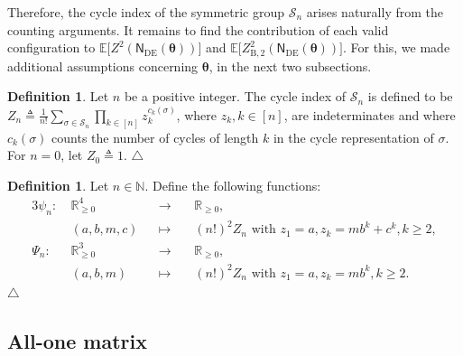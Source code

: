 \documentclass[conference]{IEEEtran}
\theoremstyle{plain}
\theoremstyle{definition}
\newtheorem{definition}[thm]{Definition}
\newcommand{\edefn}{\hfill$\triangle$}
\providecommand{\N}{\mathbb {N}}
\providecommand{\R}{\mathbb {R}}
\newcommand{\B}{\mathrm{B}}
\newcommand{\E}{\mathbb {E}}
\newcommand{\sfn}{\mathsf{N}}
\newcommand{\btheta}{\boldsymbol{\theta}}
\newcommand{\defeq}{\triangleq}
\newcommand{\sfnDE}{\sfn_{\mathrm{DE}}}
\begin{document}

Therefore, the cycle index of the symmetric group $\mathcal{S}_n$ arises
naturally from the counting arguments. It remains to find the contribution of
each valid configuration to $\E \big[Z^2(\sfnDE(\btheta))\big]$ and $ \E
\big[Z_{\B,2}^2(\sfnDE(\btheta))\big]$. For this, we made additional
assumptions concerning $\btheta$, in the next two subsections.


\begin{definition}
 Let $n$ be a positive integer. The cycle index of $\mathcal{S}_n$ is defined
 to be
 $Z_n \defeq \frac{1}{n!}\sum_{\sigma\in
   \mathcal{S}_n}\prod_{k\in[n]}z_k^{c_k(\sigma)}$, where $z_k,k\in [n]$, are
 indeterminates and where $c_k(\sigma)$ counts the number of cycles of length
 $k$ in the cycle representation of $\sigma$. For $n = 0$, let
 $Z_0 \defeq 1$.
 \edefn
\end{definition}


\begin{definition}
 Let $n\in\N$. Define the following functions:
 \begin{alignat*}{3}
  \psi_n : \
   & \R_{\geq 0}^4 &  & \to     &  & \ \R_{\geq 0},                                               \\
   & (a,b,m,c)     &  & \mapsto &  & \ (n!)^2Z_n \text{ with }z_1{=}a,z_k{=}mb^k{+}c^k,k{\geq} 2, \\
  \Psi_n : \
   & \R_{\geq 0}^3 &  & \to     &  & \ \R_{\geq 0},                                               \\
   & (a,b,m)       &  & \mapsto &  & \ (n!)^2Z_n \text{ with }z_1{=}a,z_k{=}mb^k,k{\geq} 2.
 \end{alignat*}
 \edefn
\end{definition}


\subsection{All-one matrix}

\end{document}
